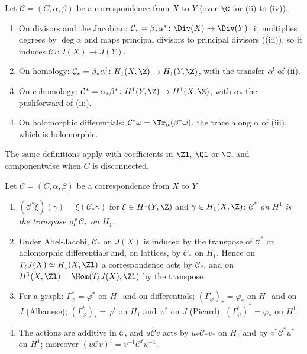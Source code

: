 \begin{definition}\label{def:curves:correspondence-actions}
Let $\mathcal C=(C,\alpha,\beta)$ be a correspondence from $X$ to $Y$ (over $\C$ for (ii) to (iv)).
\begin{enumerate}[label=(\roman*)]
\item On divisors and the Jacobian: $\mathcal C_*=\beta_*\alpha^*\colon\Div(X)\to\Div(Y)$; it multiplies degrees by $\deg\alpha$ and maps principal divisors to principal divisors
((iii)), so it induces $\mathcal C_*\colon J(X)\to J(Y)$.
\item On homology: $\mathcal C_*=\beta_*\alpha^!\colon H_1(X,\Z)\to H_1(Y,\Z)$, with the transfer $\alpha^!$ of (ii).
\item On cohomology: $\mathcal C^*=\alpha_*\beta^*\colon H^1(Y,\Z)\to H^1(X,\Z)$, with $\alpha_*$ the pushforward of (iii).
\item On holomorphic differentials: $\mathcal C^*\omega=\Tr_\alpha(\beta^*\omega)$, the trace along $\alpha$ of (iii), which is holomorphic.
\end{enumerate}
The same definitions apply with coefficients in $\Zl$, $\Ql$ or $\C$, and componentwise when $C$ is disconnected.
\end{definition}

\begin{proposition}[compatibilities]\label{prop:curves:correspondence-actions}
Let $\mathcal C=(C,\alpha,\beta)$ be a correspondence from $X$ to $Y$.
\begin{enumerate}[label=(\alph*)]
\item $(\mathcal C^*\xi)(\gamma)=\xi(\mathcal C_*\gamma)$ for $\xi\in H^1(Y,\Z)$ and $\gamma\in H_1(X,\Z)$: \emph{$\mathcal C^*$ on $H^1$ is the transpose of $\mathcal C_*$ on $H_1$}.
\item Under Abel-Jacobi, $\mathcal C_*$ on $J(X)$ is induced by the transpose of $\mathcal C^*$ on holomorphic differentials and, on lattices, by $\mathcal C_*$ on $H_1$. Hence on
$T_\ell J(X)\simeq H_1(X,\Zl)$ a correspondence acts by $\mathcal C_*$, and on $H^1(X,\Zl)=\Hom(T_\ell J(X),\Zl)$ by the transpose.
\item For a graph: $\Gamma_\varphi^*=\varphi^*$ on $H^1$ and on differentials; $(\Gamma_\varphi)_*=\varphi_*$ on $H_1$ and on $J$ (Albanese); $(\Gamma_\varphi^t)_*=\varphi^!$ on $H_1$ and $\varphi^*$ on $J$
(Picard); $(\Gamma_\varphi^t)^*=\varphi_*$ on $H^1$.
\item The actions are additive in $\mathcal C$, and $u\mathcal Cv$ acts by $u_*\mathcal C_*v_*$ on $H_1$ and by $v^*\mathcal C^*u^*$ on $H^1$; moreover $(u\mathcal Cv)^t=v^{-1}\mathcal C^tu^{-1}$.
\end{enumerate}
\end{proposition}

